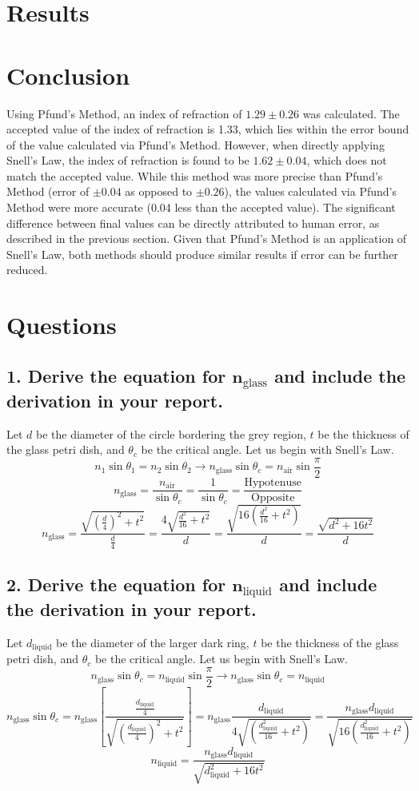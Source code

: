 \documentclass[12pt]{article}
\begin{document}
\section{Results}

\newpage
\section{Conclusion}
Using Pfund's Method, an index of refraction of $1.29\pm0.26$ was calculated. The accepted value of the index of refraction is 1.33, which lies within the error bound of the value calculated via Pfund's Method. However, when directly applying Snell's Law, the index of refraction is found to be $1.62\pm0.04$, which does not match the accepted value. While this method was more precise than Pfund's Method (error of $\pm0.04$ as opposed to $\pm0.26$), the values calculated via Pfund's Method were more accurate (0.04 less than the accepted value). The significant difference between final values can be directly attributed to human error, as described in the previous section. 
Given that Pfund's Method is an application of Snell's Law, both methods should produce similar results if error can be further reduced.
\newpage
\section{Questions}
\subsection*{1. Derive the equation for $\bm n_\text{glass}$ and include the derivation in your report.}
    Let $d$ be the diameter of the circle bordering the grey region, $t$ be the thickness of the glass petri dish, and $\theta_c$ be the critical angle. Let us begin with Snell's Law.
    \[n_1\sin{\theta_1}=n_2\sin{\theta_2}\rightarrow n_{\text{glass}}\sin{\theta_c}=n_{\text{air}}\sin{\frac{\pi}{2}}\]
    \[n_{\text{glass}}=\frac{n_{\text{air}}}{\sin\theta_c}=\frac{1}{\sin\theta_c}=\frac{\text{Hypotenuse}}{\text{Opposite}}\]
    \[n_{\text{glass}}=\frac{\sqrt{\left(\frac{d}{4}\right)^2+t^2}}{\frac{d}{4}}=\frac{4\sqrt{\frac{d^2}{16}+t^2}}{d}=\frac{\sqrt{16\left(\frac{d^2}{16}+t^2\right)}}{d}=\frac{\sqrt{d^2+16t^2}}{d}\]
\subsection*{2. Derive the equation for $\bm n_{\text{liquid}}$ and include the derivation in your report.}
    Let $d_{\text{liquid}}$ be the diameter of the larger dark ring, $t$ be the thickness of the glass petri dish, and $\theta_c$ be the critical angle. Let us begin with Snell's Law.
    \[n_{\text{glass}}\sin{\theta_c}=n_{\text{liquid}}\sin{\frac{\pi}{2}}\rightarrow n_{\text{glass}}\sin\theta_c=n_{\text{liquid}}\]
    \[n_{\text{glass}}\sin{\theta_c}=n_{\text{glass}}\left[\frac{\frac{d_{\text{liquid}}}{4}}{\sqrt{\left(\frac{d_{\text{liquid}}}{4}\right)^2+t^2}}\right]=n_{\text{glass}}\frac{d_{\text{liquid}}}{4\sqrt{\left(\frac{d^2_\text{liquid}}{16}+t^2\right)}}=\frac{n_{\text{glass}}d_{\text{liquid}}}{\sqrt{16\left(\frac{d_{\text{liquid}}^2}{16}+t^2\right)}}\]
    \[n_{\text{liquid}}=\frac{n_{\text{glass}}d_\text{liquid}}{\sqrt{d^2_{\text{liquid}}+16t^2}}\]
\end{document}
